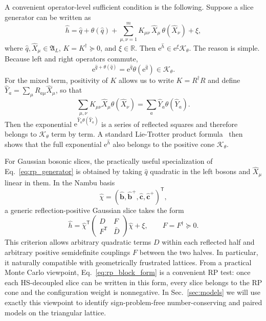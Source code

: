 \documentclass[twocolumn,aps,prb,10pt,amsmath,amssymb,amsthm,superscriptaddress]{revtex4-2}
\newcommand{\ee}{\mathrm{e}}
\newcommand{\trans}{\mathsf{T}}
\newcommand{\hc}{\dagger}
\newcommand{\mc}[1]{\mathcal{#1}}
\newcommand{\bb}[1]{\bm{#1}}
\theoremstyle{remark}
\begin{document}
A convenient operator-level sufficient condition is the following. Suppose a slice generator can be written as
\begin{equation}
    \hat h = \hat q + \theta(\hat q) + \sum_{\mu,\nu=1}^{m} K_{\mu\nu}\,\hat X_\mu\,\theta(\hat X_\nu) + \xi,
    \label{eq:rp_generator}
\end{equation}
where $\hat q,\hat X_\mu\in\mathfrak A_L$, $K=K^\hc\succeq 0$, and $\xi\in\mathbb R$. Then $\ee^{\hat h}\in \ee^{\xi}\mc K_\theta$. The reason is simple. Because left and right operators commute,
\begin{equation}
    \ee^{\hat q+\theta(\hat q)} = \ee^{\hat q}\theta(\ee^{\hat q}) \in \mc K_\theta.
\end{equation}
For the mixed term, positivity of $K$ allows us to write $K=R^\hc R$ and define $\hat Y_a=\sum_\mu R_{a\mu}\hat X_\mu$, so that
\begin{equation}
    \sum_{\mu,\nu}K_{\mu\nu}\hat X_\mu\theta(\hat X_\nu)
    = \sum_a \hat Y_a\theta(\hat Y_a).
\end{equation}
Then the exponential $\ee^{\hat Y_a\theta(\hat Y_a)}$ is a series of reflected squares and therefore belongs to $\mc K_\theta$ term by term. A standard Lie-Trotter product formula~\cite{trotter1959product} then shows that the full exponential $\ee^{\hat h}$ also belongs to the positive cone $\mc K_\theta$.

For Gaussian bosonic slices, the practically useful specialization of Eq.~\ref{eq:rp_generator} is obtained by taking $\hat q$ quadratic in the left bosons and $\hat X_\mu$ linear in them. 
In the Nambu basis
\begin{equation}
    \hat\chi = (\hat{\bb b},\hat{\bb b}^+,\hat{\bb c},\hat{\bb c}^+)^\trans,
\end{equation}
a generic reflection-positive Gaussian slice takes the form
\begin{equation}
    \hat h = \hat\chi^\trans
    \begin{pmatrix}
        D & F \\
        F^\trans & \bar D
    \end{pmatrix}
    \hat\chi + \xi,
    \qquad F = F^\hc \succeq 0.
    \label{eq:rp_block_form}
\end{equation}
This criterion allows arbitrary quadratic terms $D$ within each reflected half and arbitrary positive semidefinite couplings $F$ between the two halves. In particular, it naturally compatible with geometrically frustrated lattices. From a practical Monte Carlo viewpoint, Eq.~\eqref{eq:rp_block_form} is a convenient RP test: once each HS-decoupled slice can be written in this form, every slice belongs to the RP cone and the configuration weight is nonnegative. In Sec.~\ref{sec:models} we will use exactly this viewpoint to identify sign-problem-free number-conserving and paired models on the triangular lattice.
\end{document}
